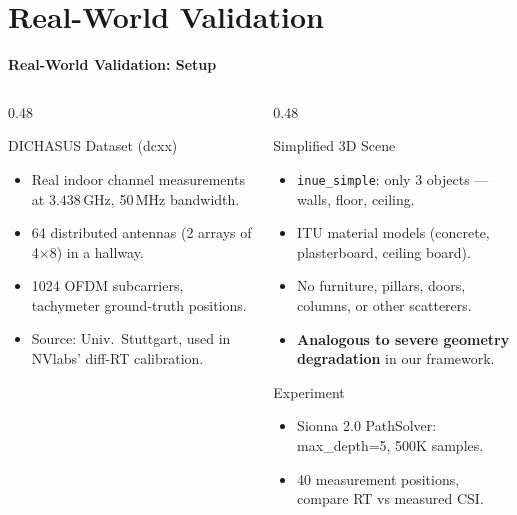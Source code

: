\documentclass[
    aspectratio=169
]{beamer}
\begin{document}
\section{Real-World Validation}

\begin{frame}{\textbf{Real-World Validation: Setup}}
\vspace{-0.2cm}
\footnotesize
\begin{columns}[T]
\begin{column}{0.48\textwidth}
\begin{block}{DICHASUS Dataset (dcxx)}
\begin{itemize}\setlength{\itemsep}{1pt}
    \item Real indoor channel measurements at 3.438\,GHz, 50\,MHz bandwidth.
    \item 64 distributed antennas (2 arrays of 4$\times$8) in a hallway.
    \item 1024 OFDM subcarriers, tachymeter ground-truth positions.
    \item Source: Univ.\ Stuttgart, used in NVlabs' diff-RT calibration.
\end{itemize}
\end{block}
\end{column}
\begin{column}{0.48\textwidth}
\begin{block}{Simplified 3D Scene}
\begin{itemize}\setlength{\itemsep}{1pt}
    \item \texttt{inue\_simple}: only 3 objects --- walls, floor, ceiling.
    \item ITU material models (concrete, plasterboard, ceiling board).
    \item No furniture, pillars, doors, columns, or other scatterers.
    \item \textbf{Analogous to severe geometry degradation} in our framework.
\end{itemize}
\end{block}
\begin{block}{Experiment}
\begin{itemize}\setlength{\itemsep}{1pt}
    \item Sionna 2.0 PathSolver: max\_depth=5, 500K samples.
    \item 40 measurement positions, compare RT vs measured CSI.
\end{itemize}
\end{block}
\end{column}
\end{columns}
\end{frame}
\end{document}
